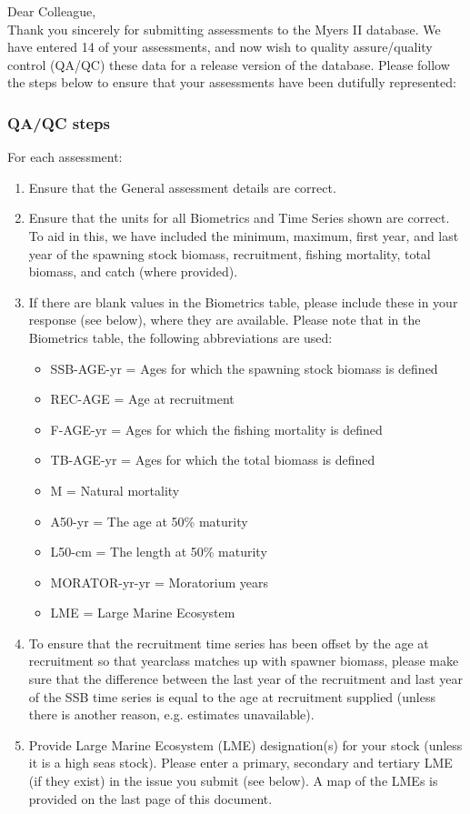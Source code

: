 \documentclass [a4paper, 10pt] {article}
\begin{document}
\noindent Dear Colleague,\\

\noindent Thank you sincerely for submitting assessments to the Myers II database. We have entered 14 of your assessments, and now wish to quality assure/quality control (QA/QC) these data for a release version of the database. Please follow the steps below to ensure that your assessments have been dutifully represented:
\subsubsection{QA/QC steps}
For each assessment:
\begin{enumerate}
\item Ensure that the General assessment details are correct.
\item Ensure that the units for all Biometrics and Time Series shown are correct. To aid in this, we have included the minimum, maximum, first year, and last year of the spawning stock biomass, recruitment, fishing mortality, total biomass, and  catch  (where provided). 
\item If there are blank values in the Biometrics table, please include these in your response (see below), where they are available.
Please note that in the Biometrics table, the following abbreviations are used:
\begin{itemize}
\item SSB-AGE-yr  = Ages for which the spawning stock biomass is defined
\item REC-AGE     = Age at recruitment
\item F-AGE-yr    = Ages for which the fishing mortality is defined 
\item TB-AGE-yr   = Ages for which the total biomass is defined
\item M      = Natural mortality
\item A50-yr      = The age at 50\% maturity
\item L50-cm      = The length at 50\% maturity
\item MORATOR-yr-yr = Moratorium years
\item LME = Large Marine Ecosystem\\
\end{itemize}
\item To ensure that the recruitment time series has been offset by the age at recruitment so that yearclass matches up with spawner biomass, please make sure that the difference between the last year of the recruitment and last year of the SSB time series is equal to the age at recruitment supplied (unless there is another reason, e.g. estimates unavailable). 
\item Provide Large Marine Ecosystem (LME) designation(s) for your stock (unless it is a high seas stock). Please enter a primary, secondary and tertiary LME (if they exist) in the issue you submit (see below). A map of the LMEs is provided on the last page of this document. 
\end{enumerate}
\vspace{-.25in}
\end{document}
